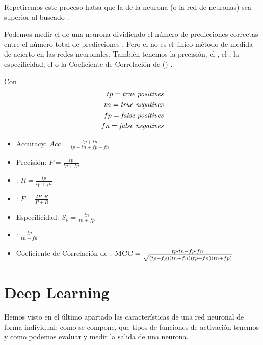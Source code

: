 \begin{enumerate}
        Repetiremos este proceso hatsa que la  de la neurona (o la red de neuronas) sea superior al  buscado .

        Podemos medir el  de una neurona dividiendo el número de predicciones correctas entre el número total de predicciones . Pero el  no es el único método de medida de acierto en las redes neuronales. También tenemos la precisión, el , el , la especificidad, el  o la Coeficiente de Correlación de  () .

        Con
        \begin{align*}
          tp = {\textit{true positives}}  \\
          tn = {\textit{true negatives}}  \\
          fp = {\textit{false positives}} \\
          fn = {\textit{false negatives}}
        \end{align*}

        \begin{itemize}
          \item Accuracy: $Acc = \frac{tp + tn}{tp + tn + fp + fn}$
          \item Precisión: $P = \frac{tp}{tp + fp}$
          \item {}: $R = \frac{tp}{tp+ fn}$
          \item {}: $F = \frac{2P \cdot R}{P + R}$
          \item Especificidad: $S_p = \frac{tn}{tn + fp}$
          \item {}: $\frac{fp}{tn + fp}$
          \item Coeficiente de Correlación de : ${\textsc{MCC}} = \frac{tp \cdot tn - fp \cdot fn}{\sqrt{(tp + fp)(tn + fn)(tp + fn)(tn + fp)}}$
        \end{itemize}
\end{enumerate}

\section{Deep Learning}

Hemos visto en el último apartado las características de una red neuronal de forma individual: como se compone, que tipos de funciones de activación tenemos y como podemos evaluar y medir la salida de una neurona.

